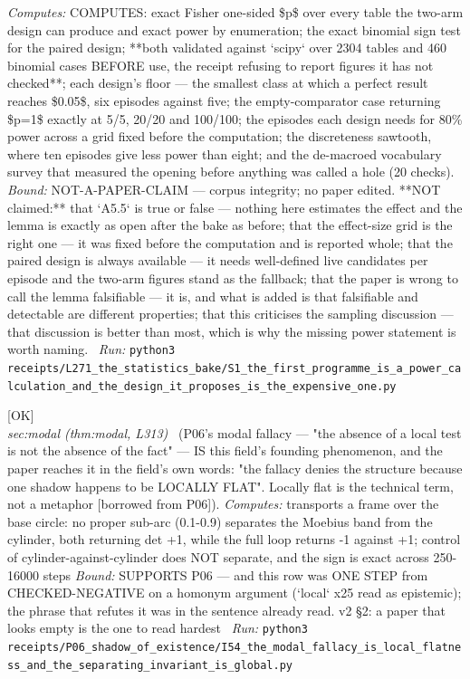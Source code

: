 \begin{description}
\emph{Computes:} COMPUTES: exact Fisher one-sided \$p\$ over every table the two-arm design can produce and exact power by enumeration; the exact binomial sign test for the paired design; **both validated against `scipy` over 2304 tables and 460 binomial cases BEFORE use, the receipt refusing to report figures it has not checked**; each design's floor --- the smallest class at which a perfect result reaches \$0.05\$, six episodes against five; the empty-comparator case returning \$p=1\$ exactly at 5/5, 20/20 and 100/100; the episodes each design needs for 80\% power across a grid fixed before the computation; the discreteness sawtooth, where ten episodes give less power than eight; and the de-macroed vocabulary survey that measured the opening before anything was called a hole (20 checks).
 \emph{Bound:} NOT-A-PAPER-CLAIM --- corpus integrity; no paper edited. **NOT claimed:** that `A5.5` is true or false --- nothing here estimates the effect and the lemma is exactly as open after the bake as before; that the effect-size grid is the right one --- it was fixed before the computation and is reported whole; that the paired design is always available --- it needs well-defined live candidates per episode and the two-arm figures stand as the fallback; that the paper is wrong to call the lemma falsifiable --- it is, and what is added is that falsifiable and detectable are different properties; that this criticises the sampling discussion --- that discussion is better than most, which is why the missing power statement is worth naming.
\ \emph{Run:} \texttt{python3 receipts/L271\_the\_statistics\_bake/S1\_the\_first\_programme\_is\_a\_power\_calculation\_and\_the\_design\_it\_proposes\_is\_the\_expensive\_one.py}
\item[\rcptlabel{I54_the_modal_fallacy_is_local_flatness_and_the_separating_invariant_is_global}{P6R4}\textbf{P6R4}\quad\texttt{I54\_the\_modal\_fallacy\_is\_local\_flatness\_and\_the\_separating\_invariant\_is\_global}]\hfill\textsf{[OK]}\\
\textit{sec:modal (thm:modal, L313)} \ (P06's modal fallacy --- "the absence of a local test is not the absence of the fact" --- IS this field's founding phenomenon, and the paper reaches it in the field's own words: "the fallacy denies the structure because one shadow happens to be LOCALLY FLAT". Locally flat is the technical term, not a metaphor [borrowed from P06]). 
\emph{Computes:} transports a frame over the base circle: no proper sub-arc (0.1-0.9) separates the Moebius band from the cylinder, both returning det +1, while the full loop returns -1 against +1; control of cylinder-against-cylinder does NOT separate, and the sign is exact across 250-16000 steps
 \emph{Bound:} SUPPORTS P06 --- and this row was ONE STEP from CHECKED-NEGATIVE on a homonym argument (`local` x25 read as epistemic); the phrase that refutes it was in the sentence already read. v2 \S{}2: a paper that looks empty is the one to read hardest
\ \emph{Run:} \texttt{python3 receipts/P06\_shadow\_of\_existence/I54\_the\_modal\_fallacy\_is\_local\_flatness\_and\_the\_separating\_invariant\_is\_global.py}
\end{description}\endgroup
